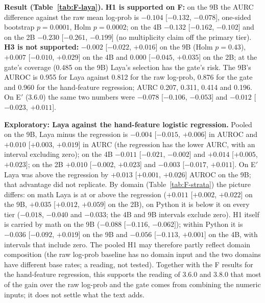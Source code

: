 \documentclass[11pt,a4paper]{article}
\begin{document}


\textbf{Result (Table~\ref{tab:F-laya}).} \textbf{H1 is supported on F:} on the 9B the AURC difference against the raw mean log-prob is $-0.104$ [$-0.132$, $-0.078$], one-sided bootstrap $p=0.0001$, Holm $p=0.0002$; on the 4B $-0.132$ [$-0.162$, $-0.102$] and on the 2B $-0.230$ [$-0.261$, $-0.199$] (no multiplicity claim off the primary tier). \textbf{H3 is not supported:} $-0.002$ [$-0.022$, $+0.016$] on the 9B (Holm $p=0.43$), $+0.007$ [$-0.010$, $+0.029$] on the 4B and $0.000$ [$-0.045$, $+0.035$] on the 2B; at the gate's coverage (0.485 on the 9B) Laya's selection has the gate's risk. The 9B's AUROC is 0.955 for Laya against 0.812 for the raw log-prob, 0.876 for the gate and 0.960 for the hand-feature regression; AURC 0.207, 0.311, 0.414 and 0.196. On E$'$ (3.6.0) the same two numbers were $-0.078$ [$-0.106$, $-0.053$] and $-0.012$ [$-0.023$, $+0.011$].

\textbf{Exploratory: Laya against the hand-feature logistic regression.} Pooled on the 9B, Laya minus the regression is $-0.004$ [$-0.015$, $+0.006$] in AUROC and $+0.010$ [$+0.003$, $+0.019$] in AURC (the regression has the lower AURC, with an interval excluding zero); on the 4B $-0.011$ [$-0.021$, $-0.002$] and $+0.014$ [$+0.005$, $+0.023$]; on the 2B $+0.010$ [$-0.002$, $+0.023$] and $-0.003$ [$-0.017$, $+0.011$]. On E$'$ Laya was above the regression by $+0.013$ [$+0.001$, $+0.026$] AUROC on the 9B; that advantage did not replicate. By domain (Table~\ref{tab:F-strata}) the picture differs: on math Laya is at or above the regression ($+0.011$ [$+0.002$, $+0.022$] on the 9B, $+0.035$ [$+0.012$, $+0.059$] on the 2B), on Python it is below it on every tier ($-0.018$, $-0.040$ and $-0.033$; the 4B and 9B intervals exclude zero). H1 itself is carried by math on the 9B ($-0.088$ [$-0.116$, $-0.062]$); within Python it is $-0.036$ [$-0.092$, $+0.019$] on the 9B and $-0.056$ [$-0.113$, $+0.001$] on the 4B, with intervals that include zero. The pooled H1 may therefore partly reflect domain composition (the raw log-prob baseline has no domain input and the two domains have different base rates; a reading, not tested). Together with the F results for the hand-feature regression, this supports the reading of 3.6.0 and 3.8.0 that most of the gain over the raw log-prob and the gate comes from combining the numeric inputs; it does not settle what the text adds.
\end{document}
